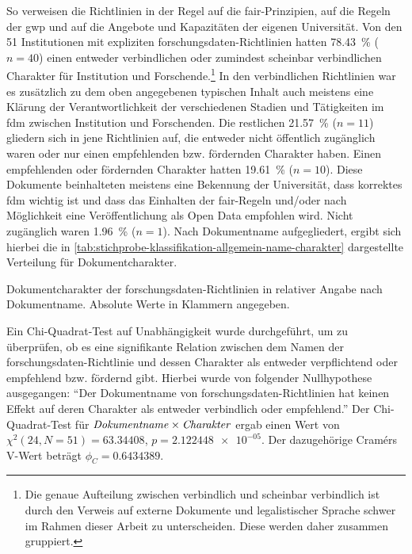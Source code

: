 So verweisen die Richtlinien in der Regel auf die \gls{fair}-Prinzipien, auf die Regeln der \gls{gwp} und auf die Angebote und Kapazitäten der eigenen Universität.
Von den 51 Institutionen mit expliziten \gls{forschungsdaten}-Richtlinien hatten \SI{78,43}{\percent} ($n=\num{40}$) einen entweder verbindlichen oder zumindest scheinbar verbindlichen Charakter für Institution und Forschende.\footnote{Die genaue Aufteilung zwischen verbindlich und scheinbar verbindlich ist durch den Verweis auf externe Dokumente und legalistischer Sprache schwer im Rahmen dieser Arbeit zu unterscheiden. Diese werden daher zusammen gruppiert.}
In den verbindlichen Richtlinien war es zusätzlich zu dem oben angegebenen typischen Inhalt auch meistens eine Klärung der Verantwortlichkeit der verschiedenen Stadien und Tätigkeiten im \gls{fdm} zwischen Institution und Forschenden.
Die restlichen \SI{21,57}{\percent} ($n=\num{11}$) gliedern sich in jene Richtlinien auf, die entweder nicht öffentlich zugänglich waren oder nur einen empfehlenden bzw. fördernden Charakter haben.
Einen empfehlenden oder fördernden Charakter hatten \SI{19,61}{\percent} ($n=\num{10}$).
Diese Dokumente beinhalteten meistens eine Bekennung der Universität, dass korrektes \gls{fdm} wichtig ist und dass das Einhalten der \gls{fair}-Regeln und/oder nach Möglichkeit eine Veröffentlichung als Open Data empfohlen wird.
Nicht zugänglich waren \SI{1,96}{\percent} ($n=\num{1}$).
Nach Dokumentname aufgegliedert, ergibt sich hierbei die in \cref{tab:stichprobe-klassifikation-allgemein-name-charakter} dargestellte Verteilung für Dokumentcharakter.
\begin{table}[!htbp]
	\caption{Dokumentcharakter der \gls{forschungsdaten}-Richtlinien in relativer Angabe nach Dokumentname. Absolute Werte in Klammern angegeben.}
    
	\label{tab:stichprobe-klassifikation-allgemein-name-charakter}
\end{table}
Ein Chi-Quadrat-Test auf Unabhängigkeit wurde durchgeführt, um zu überprüfen, ob es eine signifikante Relation zwischen dem Namen der \gls{forschungsdaten}-Richtlinie und dessen Charakter als entweder verpflichtend oder empfehlend bzw. fördernd gibt.
Hierbei wurde von folgender Nullhypothese ausgegangen:
\enquote{Der Dokumentname von \gls{forschungsdaten}-Richtlinien hat keinen Effekt auf deren Charakter als entweder verbindlich oder empfehlend.}
Der Chi-Quadrat-Test für $\text{\textit{Dokumentname}}\times\text{\textit{Charakter}}$ ergab einen Wert von $\chi^2 (\num{24}, N = \num{51}) = \num[round-mode=places,round-precision=3]{63,34408}$, $p = \num[round-mode=places,round-precision=3]{2,122448e-05}$.
Der dazugehörige Cramérs V-Wert beträgt $\phi_C=\num[round-mode=places,round-precision=3]{0.6434389}$.

